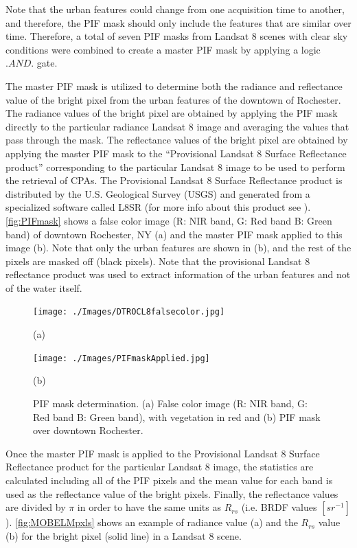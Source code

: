 \documentclass[onecolumn,3p,letterpaper]{elsarticle}
\begin{document}
Note that the urban features could change from one acquisition time to another, and therefore, the PIF mask should only include the features that are similar over time. Therefore, a total of seven PIF masks from Landsat 8 scenes with clear sky conditions were combined to create a master PIF mask by applying a logic $.AND.$ gate.

The master PIF mask is utilized to determine both the radiance and reflectance value of the bright pixel from the urban features of the downtown of Rochester. The radiance values of the bright pixel are obtained by applying the PIF mask directly to the particular radiance Landsat 8 image and averaging the values that pass through the mask. The reflectance values of the bright pixel are obtained by applying the master PIF mask to the ``Provisional Landsat 8 Surface Reflectance product'' corresponding to the particular Landsat 8 image to be used to perform the retrieval of CPAs. The Provisional Landsat 8 Surface Reflectance product is distributed by the U.S. Geological Survey (USGS) and generated from a specialized software called L8SR (for more info about this product see \citet{L8SurfProduct2015}). \autoref{fig:PIFmask} shows a false color image (R: NIR  band, G: Red band B: Green band) of downtown Rochester, NY (a) and the master PIF mask applied to this image (b). Note that only the urban features are shown in (b), and the rest of the pixels are masked off (black pixels). Note that the provisional Landsat 8 reflectance product was used to extract information of the urban features and not of the water itself.

\begin{figure}[htb]
  \begin{minipage}[c]{0.48\linewidth}
    \centering
      \texttt{[image: ./Images/DTROCL8falsecolor.jpg]}
    \centerline{(a)}\medskip
  \end{minipage}
  \hfill
  \begin{minipage}[d]{0.48\linewidth}
    \centering
      \texttt{[image: ./Images/PIFmaskApplied.jpg]}
    \centerline{(b)}\medskip
  \end{minipage}
  \caption{PIF mask determination. (a) False color image (R: NIR band, G: Red band B: Green band), with vegetation in red and (b) PIF mask over downtown Rochester. \label{fig:PIFmask} } 
\end{figure}

Once the master PIF mask is applied to the Provisional Landsat 8 Surface Reflectance product for the particular Landsat 8 image, the statistics are calculated including all of the PIF pixels and the mean value for each band is used as the reflectance value of the bright pixels. Finally, the reflectance values are divided by $\pi$ in order to have the same units as $R_{rs}$ (i.e. BRDF values $[sr^{-1}]$). \autoref{fig:MOBELMpxls} shows an example of radiance value (a) and the $R_{rs}$ value (b) for the bright pixel (solid line) in a Landsat 8 scene.
\end{document}
